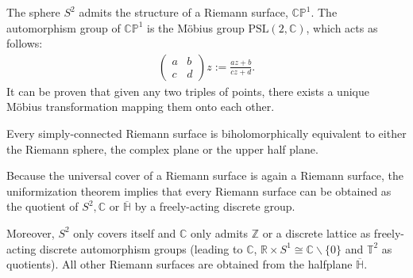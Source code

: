     \begin{example}\label{complex:riemann_sphere}
        The sphere $S^2$ admits the structure of a Riemann surface, $\mathbb{CP}^1$. The automorphism group of $\mathbb{CP}^1$ is the M\"obius group $\mathrm{PSL}(2,\mathbb{C})$, which acts as follows:
        \begin{gather}
            \begin{pmatrix}
                a&b\\
                c&d
            \end{pmatrix}
            z := \frac{az+b}{cz+d}.
        \end{gather}
        It can be proven that given any two triples of points, there exists a unique M\"obius transformation mapping them onto each other.
    \end{example}

    \begin{theorem}
        Every simply-connected Riemann surface is biholomorphically equivalent to either the Riemann sphere, the complex plane or the upper half plane.
    \end{theorem}
    \begin{result}
        Because the universal cover of a Riemann surface is again a Riemann surface, the uniformization theorem implies that every Riemann surface can be obtained as the quotient of $S^2,\mathbb{C}$ or $\overline{\mathbb{H}}$ by a freely-acting discrete group.

        Moreover, $S^2$ only covers itself and $\mathbb{C}$ only admits $\mathbb{Z}$ or a discrete lattice as freely-acting discrete automorphism groups (leading to $\mathbb{C}$, $\mathbb{R}\times S^1\cong\mathbb{C}\backslash\{0\}$ and $\mathbb{T}^2$ as quotients). All other Riemann surfaces are obtained from the halfplane $\overline{\mathbb{H}}$.
    \end{result}


